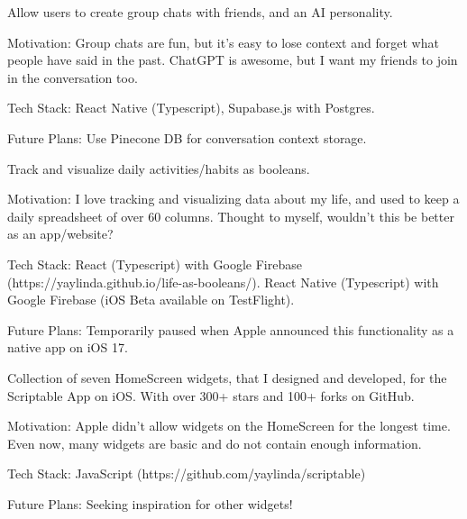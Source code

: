 \documentclass[letterpaper]{deedy-resume-openfont} %
\begin{document}
\descript{}
\begin{tightemize}
\item Allow users to create group chats with friends, and an AI personality.
\item Motivation: Group chats are fun, but it's easy to lose context and forget what people have said in the past. ChatGPT is awesome, but I want my friends to join in the conversation too.
\item Tech Stack: React Native (Typescript), Supabase.js with Postgres.
\item Future Plans: Use Pinecone DB for conversation context storage.
\end{tightemize}
\sectionsep %

\descript{}
\begin{tightemize}
\item Track and visualize daily activities/habits as booleans.
\item Motivation: I love tracking and visualizing data about my life, and used to keep a daily spreadsheet of over 60 columns. Thought to myself, wouldn't this be better as an app/website?
\item Tech Stack: React (Typescript) with Google Firebase (https://yaylinda.github.io/life-as-booleans/). React Native (Typescript) with Google Firebase (iOS Beta available on TestFlight).
\item Future Plans: Temporarily paused when Apple announced this functionality as a native app on iOS 17.
\end{tightemize}
\sectionsep %

\descript{}
\begin{tightemize}
\item Collection of seven HomeScreen widgets, that I designed and developed, for the Scriptable App on iOS. With over 300+ stars and 100+ forks on GitHub.
\item Motivation: Apple didn't allow widgets on the HomeScreen for the longest time. Even now, many widgets are basic and do not contain enough information.
\item Tech Stack: JavaScript (https://github.com/yaylinda/scriptable)
\item Future Plans: Seeking inspiration for other widgets!
\end{tightemize}
\sectionsep %

\end{document}
